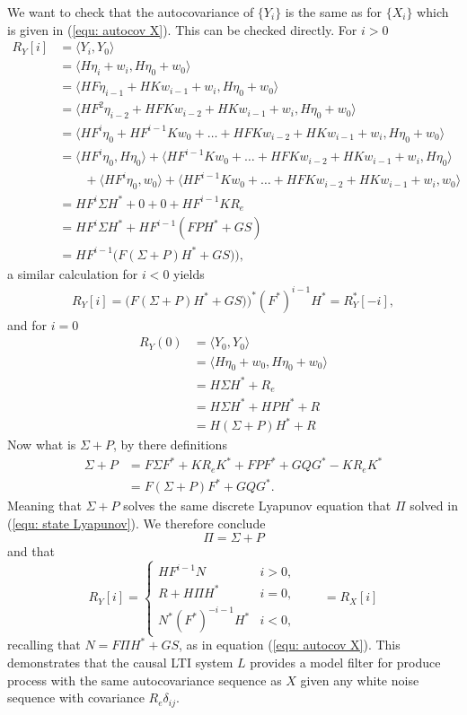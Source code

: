 \documentclass[12pt]{amsart}
\begin{document}
We want to check that the autocovariance of $\{Y_i\}$ is the same as for $\{X_i\}$ which is given in (\ref{equ: autocov X}). This can be checked directly. For $i>0$
\begin{align*}
R_Y[i] &= \langle Y_i, Y_0 \rangle \\
	&= \langle H\eta_i+w_i, H\eta_0 + w_0 \rangle \\
	&= \langle HF\eta_{i-1}+HKw_{i-1} + w_i, H\eta_0 + w_0 \rangle \\
	&= \langle HF^2\eta_{i-2}+HFKw_{i-2} + HKw_{i-1} + w_i, H\eta_0 + w_0 \rangle \\
	&= \langle HF^i\eta_{0}+HF^{i-1}Kw_{0} + \dots + HFKw_{i-2} + HKw_{i-1} + w_i, H\eta_0 + w_0 \rangle \\
	&= \langle HF^i\eta_{0}, H\eta_0\rangle + \langle HF^{i-1}Kw_{0} + \dots + HFKw_{i-2} + HKw_{i-1} + w_i, H\eta_0 \rangle \\
	&\qquad +\langle HF^i\eta_{0}, w_0\rangle + \langle HF^{i-1}Kw_{0} + \dots + HFKw_{i-2} + HKw_{i-1} + w_i, w_0 \rangle\\
	&= HF^i\Sigma H^* + 0 + 0 + HF^{i-1}KR_e\\
	&= HF^i\Sigma H^* + HF^{i-1}(FPH^* + GS)\\
	&= HF^{i-1}\big(F(\Sigma + P)H^* + GS)\big),
\end{align*}
a similar calculation for $i<0$ yields
\begin{align*}
R_Y[i] = \big(F(\Sigma + P)H^* + GS)\big)^*(F^*)^{i-1}H^* = R^*_Y[-i],
\end{align*}
and for $i=0$
\begin{align*}
	 R_Y(0) &= \langle Y_0, Y_0 \rangle \\
	 &= \langle H\eta_0+w_0, H\eta_0 + w_0 \rangle \\
	 &= H\Sigma H^* + R_e \\
	 &= H\Sigma H^* + HPH^* + R\\
	 &= H(\Sigma + P)H^* + R
\end{align*}
Now what is $\Sigma + P$, by there definitions 
\begin{align*}
\Sigma + P &= F\Sigma F^* + KR_eK^* + FPF^* + GQG^* - KR_eK^*\\
&= F(\Sigma + P)F^* + GQG^*.
\end{align*}
Meaning that $\Sigma + P$ solves the same discrete Lyapunov equation that $\Pi$ solved in (\ref{equ: state Lyapunov}). We therefore conclude $$\Pi = \Sigma + P$$ and that 
\begin{equation}
R_Y[i] = \begin{cases}
HF^{i-1}N & i>0, \\
R + H\Pi H^* & i = 0, \\
N^*(F^*)^{-i-1}H^* & i < 0,
\end{cases} \qquad= R_X[i]
\label{equ: autocov Y}
\end{equation}
recalling that  $N= F\Pi H^* + GS$, as in equation (\ref{equ: autocov X}). This demonstrates that the causal LTI system $L$ provides a model filter for produce process with the same autocovariance sequence as $X$ given any white noise sequence with covariance $R_e\delta_{ij}$.  
\end{document}
